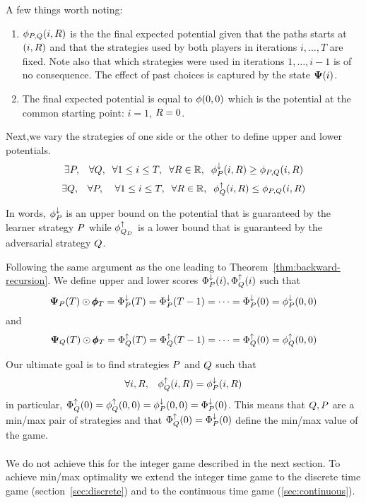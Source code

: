 \documentclass{article}[12pt]
\begin{document}
A few things worth noting:
\begin{enumerate}
\item $\phi_{P,Q}(i,R)$ is the the final expected potential
  given that the paths starts at $(i,R)$ and that
  the strategies used by both players in iterations $i,\ldots,T$ are fixed. Note
  also that which strategies were used in iterations $1,\ldots,i-1$ is
  of no consequence. The effect of past choices is captured by the
  state ${\bf \Psi}(i)$.
\item
  The final expected potential is equal to $\phi(0,0)$ which is the
  potential at the common starting point: $i=1$, $R=0$.
\end{enumerate}


Next,we vary the strategies of one side or the other to define upper
and lower potentials.
\begin{equation} \label{eqn:upperPotentials}
  \exists P, \;\;\; \forall Q,\;\; \forall 1\leq i \leq
  T,\;\; \forall R \in \mathbb{R},\;\; \phi_{P}^{\downarrow}(i,R) \geq \phi_{P,Q}(i,R)
\end{equation}
\begin{equation} \label{eqn:lowerPotentials}
  \exists Q, \;\;\; \forall P, \;\; \;\; \forall 1\leq i \leq
  T,\;\; \forall R \in \mathbb{R},\;\; \phi_{Q}^{\uparrow}(i,R) \leq \phi_{P,Q}(i,R)
\end{equation}

In words, $\phi_{P}^{\downarrow}$ is an upper bound on the potential that is 
guaranteed by the learner strategy $P$ while $\phi_{Q_D}^{\uparrow}$
is a lower bound that is guaranteed by the adversarial
strategy $Q$.

Following the same argument as the one leading to
Theorem~\ref{thm:backward-recursion}. We define upper and lower scores
$\Phi_{P}^{\downarrow}(i),\Phi_{Q}^{\uparrow}(i)$ such that
\begin{equation} \label{eqn:upper-recursion}
  {\bf \Psi}_{P}(T)\odot \pmb{\phi}_{T}=\Phi_{P}^{\downarrow}(T)=\Phi_{P}^{\downarrow}(T-1)=\cdots=\Phi_{P}^{\downarrow}(0)=\phi_{P}^{\downarrow}(0,0)
\end{equation}
and
\begin{equation} \label{eqn:lower-recursion}
  {\bf \Psi}_{Q}(T)\odot \pmb{\phi}_{T}=\Phi_{Q}^{\uparrow}(T)=\Phi_{Q}^{\uparrow}(T-1)=\cdots=\Phi_{Q}^{\uparrow}(0)=\phi_{Q}^{\uparrow}(0,0)
\end{equation}

Our ultimate goal is to find strategies $P$ and
$Q$ such that
\begin{equation} \label{eqn:limitPotential}
\forall i,R,\;\;\; \phi_{Q}^{\uparrow}(i,R) = \phi_{P}^{\downarrow}(i,R)
\end{equation}
in particular, $\Phi_{Q}^{\uparrow}(0)=\phi_{Q}^{\uparrow}(0,0) =
\phi_{P}^{\downarrow}(0,0)=\Phi_{P}^{\downarrow}(0)$. This means that
$Q,P$ are a min/max pair of strategies and that
$\Phi_{Q}^{\uparrow}(0)=\Phi_{P}^{\downarrow}(0)$ define the min/max value of the game.
~\\~\\
We do not achieve this for the integer game described in the next
section. To achieve min/max optimality we extend the integer time game
to the discrete time game (section~\ref{sec:discrete}) and to the
continuous time game (\ref{sec:continuous}).
\end{document}
